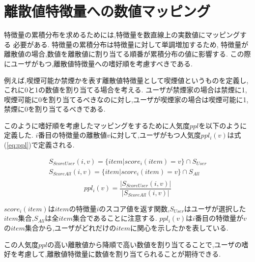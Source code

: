 \section{離散値特徴量への数値マッピング}
\label{sc:mapping}
特徴量の累積分布を求めるためには,特徴量を数直線上の実数値にマッピングする
必要がある.
特徴量の累積分布は特徴量に対して単調増加するため,
特徴量が離散値の場合,数値を離散値に割り当てる順番が累積分布の値に影響する.
この際にユーザがもつ,離散値特徴量への嗜好順を考慮すべきである.\par
例えば,喫煙可能か禁煙かを表す離散値特徴量として喫煙値というものを定義し,これに0と1の数値を割り当てる場合を考える.
ユーザが禁煙家の場合は禁煙に1,喫煙可能に0を割り当てるべきなのに対し,ユーザが喫煙家の場合は喫煙可能に1,禁煙に0を割り当てるべきである.\par
このように嗜好順を考慮したマッピングをするために人気度$ppl$を以下のように定義した.
$i$番目の特徴量の離散値$v$に対して,ユーザがもつ人気度$ppl_i(v)$は式(\ref{eq:ppl})で定義される.

\begin{gather*}
  S_{ScoreUser}(i,v)=\{item|score_{i}(item)=v\}\cap S_{User} \\
  S_{ScoreAll}(i,v)=\{item|score_{i}(item)=v\}\cap S_{All} \\
\end{gather*}
\begin{equation}
  \label{eq:ppl}
  ppl_i(v)=\frac{|S_{ScoreUser}(i,v)|}{|S_{ScoreAll}(i,v)|}
\end{equation}\par
$score_{i}(item)$は$item$の特徴量$i$のスコア値を返す関数,$S_{User}$はユーザが選択した$item$集合,$S_{All}$は全$item$集合であることに注意する.
$ppl_i(v)$は$i$番目の特徴量が$v$の$item$集合から,ユーザがどれだけの$item$に関心を示したかを表している.\par
この人気度$ppl$の高い離散値から降順で高い数値を割り当てることで,ユーザの嗜好を考慮して,離散値特徴量に数値を割り当てられることが期待できる.
